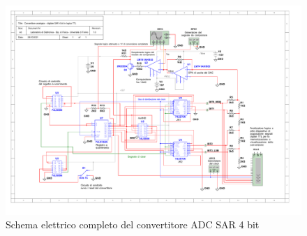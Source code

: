 \documentclass[journal]{IEEEtran}
\begin{document}
\begin{figure}[t]%
\centering
\begin{center}
\includegraphics[trim = {0 0 50 0}, width=1.40\textwidth, angle=90]{sch-simulations/digital/output/Schema_convertitore_completo.pdf}
\end{center}
\caption{Schema elettrico completo del convertitore ADC SAR 4 bit}
\label{fig:circuit_sarCompleteSchematic}
\end{figure}




\clearpage
\end{document}
